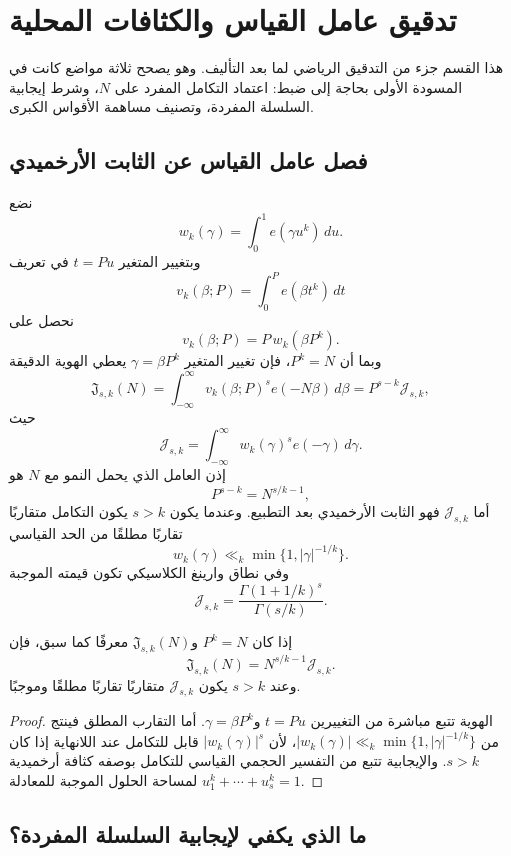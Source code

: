 \section{تدقيق عامل القياس والكثافات المحلية}

هذا القسم جزء من التدقيق الرياضي لما بعد التأليف. وهو يصحح ثلاثة مواضع كانت في المسودة الأولى بحاجة إلى ضبط: اعتماد التكامل المفرد على $N$، وشرط إيجابية السلسلة المفردة، وتصنيف مساهمة الأقواس الكبرى.

\subsection{فصل عامل القياس عن الثابت الأرخميدي}

نضع
\[
w_k(\gamma)=\int_0^1 e(\gamma u^k)\,du.
\]
وبتغيير المتغير $t=Pu$ في تعريف
\[
v_k(\beta;P)=\int_0^P e(\beta t^k)\,dt
\]
نحصل على
\[
v_k(\beta;P)=P\,w_k(\beta P^k).
\]
وبما أن $P^k=N$، فإن تغيير المتغير $\gamma=\beta P^k$ يعطي الهوية الدقيقة
\[
\mathfrak J_{s,k}(N)
=
\int_{-\infty}^{\infty}v_k(\beta;P)^s e(-N\beta)\,d\beta
=
P^{s-k}\mathcal J_{s,k},
\]
حيث
\[
\mathcal J_{s,k}
=
\int_{-\infty}^{\infty}w_k(\gamma)^s e(-\gamma)\,d\gamma.
\]
إذن العامل الذي يحمل النمو مع $N$ هو
\[
P^{s-k}=N^{s/k-1},
\]
أما $\mathcal J_{s,k}$ فهو الثابت الأرخميدي بعد التطبيع. وعندما يكون $s>k$ يكون التكامل متقاربًا تقاربًا مطلقًا من الحد القياسي
\[
w_k(\gamma)\ll_k \min\{1,|\gamma|^{-1/k}\}.
\]
وفي نطاق وارينغ الكلاسيكي تكون قيمته الموجبة
\[
\mathcal J_{s,k}
=
\frac{\Gamma(1+1/k)^s}{\Gamma(s/k)}.
\]

\begin{proposition}
\label{prop:chapter17-singular-integral-scaling}
إذا كان $P^k=N$ و$\mathfrak J_{s,k}(N)$ معرفًا كما سبق، فإن
\[
\mathfrak J_{s,k}(N)=N^{s/k-1}\mathcal J_{s,k}.
\]
وعند $s>k$ يكون $\mathcal J_{s,k}$ متقاربًا تقاربًا مطلقًا وموجبًا.
\provedhere
\end{proposition}

\begin{proof}
الهوية تتبع مباشرة من التغييرين $t=Pu$ و$\gamma=\beta P^k$. أما التقارب المطلق فينتج من $|w_k(\gamma)|\ll_k\min\{1,|\gamma|^{-1/k}\}$، لأن $|w_k(\gamma)|^s$ قابل للتكامل عند اللانهاية إذا كان $s>k$. والإيجابية تتبع من التفسير الحجمي القياسي للتكامل بوصفه كثافة أرخميدية لمساحة الحلول الموجبة للمعادلة $u_1^k+\cdots+u_s^k=1$.
\end{proof}

\subsection{ما الذي يكفي لإيجابية السلسلة المفردة؟}

